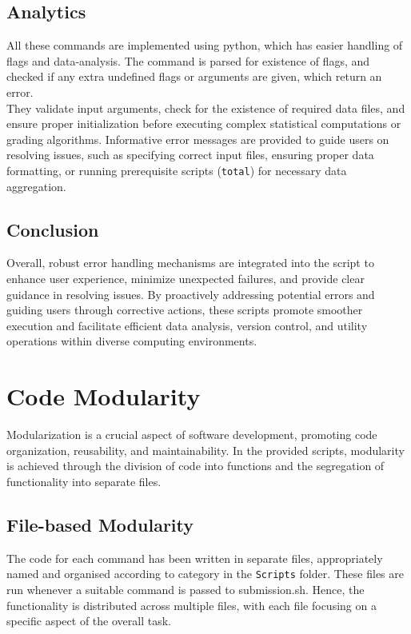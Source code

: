 \documentclass{article}
\begin{document}
\subsection{Analytics}
All these commands are implemented using python, which has easier handling of flags and data-analysis. The command is parsed for existence of flags, and checked if any extra undefined flags or arguments are given, which return an error.\\
They validate input arguments, check for the existence of required data files, and ensure proper initialization before executing complex statistical computations or grading algorithms. Informative error messages are provided to guide users on resolving issues, such as specifying correct input files, ensuring proper data formatting, or running prerequisite scripts (\texttt{total}) for necessary data aggregation.\\

\subsection{Conclusion}
Overall, robust error handling mechanisms are integrated into the script to enhance user experience, minimize unexpected failures, and provide clear guidance in resolving issues. By proactively addressing potential errors and guiding users through corrective actions, these scripts promote smoother execution and facilitate efficient data analysis, version control, and utility operations within diverse computing environments.

\section{Code Modularity}

Modularization is a crucial aspect of software development, promoting code organization, reusability, and maintainability. In the provided scripts, modularity is achieved through the division of code into functions and the segregation of functionality into separate files.\\

\subsection{File-based Modularity}

The code for each command has been written in separate files, appropriately named and organised according to category in the \texttt{Scripts} folder. These files are run whenever a suitable command is passed to submission.sh. Hence, the functionality is distributed across multiple files, with each file focusing on a specific aspect of the overall task.\\
\end{document}
